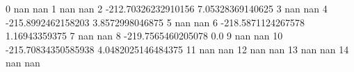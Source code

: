 0 nan nan
1 nan nan
2 -212.70326232910156 7.05328369140625
3 nan nan
4 -215.8992462158203 3.8572998046875
5 nan nan
6 -218.5871124267578 1.16943359375
7 nan nan
8 -219.7565460205078 0.0
9 nan nan
10 -215.70834350585938 4.0482025146484375
11 nan nan
12 nan nan
13 nan nan
14 nan nan
